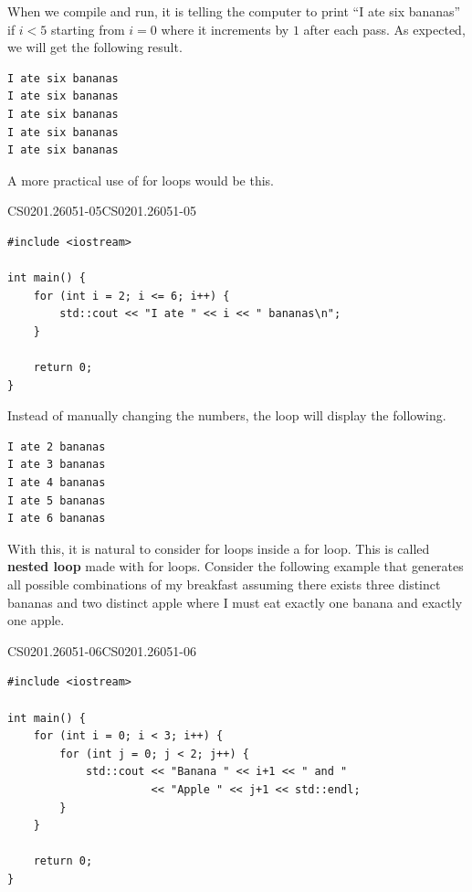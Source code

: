 \documentclass[../../main.tex]{subfiles}
\begin{document}
When we compile and run, it is telling the computer to print
``I ate six bananas'' if $i < 5$ starting from $i = 0$ where it
increments by $1$ after each pass. As expected, we will get the
following result.

\begin{outputbox}
\begin{lstlisting}[style=basic]
I ate six bananas
I ate six bananas
I ate six bananas
I ate six bananas
I ate six bananas
\end{lstlisting}
\end{outputbox}

A more practical use of for loops would be this.

\begin{cppbox}{CS0201.26051-05}{CS0201.26051-05}
\begin{lstlisting}[style=cppstyle]
#include <iostream>

int main() {
    for (int i = 2; i <= 6; i++) {
        std::cout << "I ate " << i << " bananas\n";
    }

    return 0;
}
\end{lstlisting}
\end{cppbox}

Instead of manually changing the numbers, the loop will display
the following.

\begin{outputbox}
\begin{lstlisting}[style=basic]
I ate 2 bananas
I ate 3 bananas
I ate 4 bananas
I ate 5 bananas
I ate 6 bananas
\end{lstlisting}
\end{outputbox}

With this, it is natural to consider for loops inside a for loop.
This is called \textbf{nested loop} made with for loops. Consider
the following example that generates all possible combinations of
my breakfast assuming there exists three distinct bananas and
two distinct apple where I must eat exactly one banana and exactly
one apple.

\begin{cppbox}{CS0201.26051-06}{CS0201.26051-06}
\begin{lstlisting}[style=cppstyle]
#include <iostream>

int main() {
    for (int i = 0; i < 3; i++) {
        for (int j = 0; j < 2; j++) {
            std::cout << "Banana " << i+1 << " and "
                      << "Apple " << j+1 << std::endl;
        }
    }

    return 0;
}
\end{lstlisting}
\end{cppbox}
\end{document}
